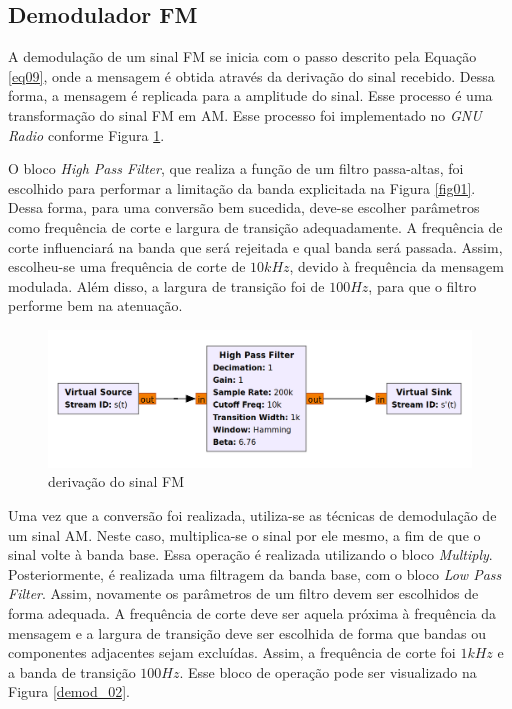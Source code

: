\subsection{Demodulador FM}


A demodulação de um sinal FM se inicia com o passo descrito pela Equação \ref{eq09}, onde a mensagem é obtida através da derivação do sinal recebido. Dessa forma, a mensagem é replicada para a amplitude do sinal. Esse processo é uma transformação do sinal FM em AM. Esse processo foi implementado no \textit{GNU Radio} conforme Figura \ref{fig:dem_01}.

O bloco \textit{High Pass Filter}, que realiza a função de um filtro passa-altas, foi escolhido para performar a limitação da banda explicitada na Figura \ref{fig01}. Dessa forma, para uma conversão bem sucedida, deve-se escolher parâmetros como frequência de corte e largura de transição adequadamente. A frequência de corte influenciará na banda que será rejeitada e qual banda será passada. Assim, escolheu-se uma frequência de corte de $10 kHz$, devido à frequência da mensagem modulada. Além disso, a largura de transição foi de $100 Hz$, para que o filtro performe bem na atenuação. 

\begin{figure}[!htb]
    \centering
    \includegraphics[width=1\linewidth]{Imagens/dem_01.png}
    \caption{derivação do sinal FM}
    \label{fig:dem_01}
\end{figure}

Uma vez que a conversão foi realizada, utiliza-se as técnicas de demodulação de um sinal AM. Neste caso, multiplica-se o sinal por ele mesmo, a fim de que o sinal volte à banda base. Essa operação é realizada utilizando o bloco \textit{Multiply}. Posteriormente, é realizada uma filtragem da banda base, com o bloco \textit{Low Pass Filter}. Assim, novamente os parâmetros de um filtro devem ser escolhidos de forma adequada. A frequência de corte deve ser aquela próxima à frequência da mensagem e a largura de transição deve ser escolhida de forma que bandas ou componentes adjacentes sejam excluídas. Assim, a frequência de corte foi $1 kHz$ e a banda de transição $100 Hz$. Esse bloco de operação pode ser visualizado na Figura \ref{demod_02}.

